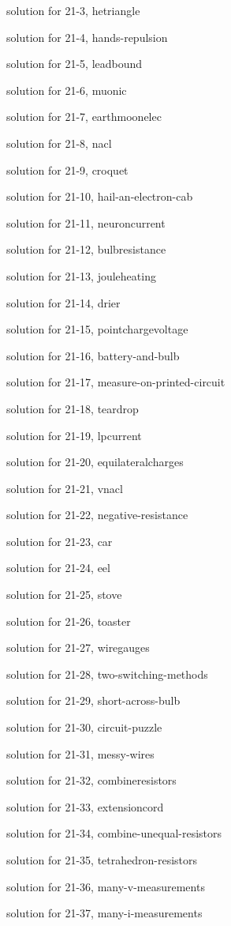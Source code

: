 \documentclass{problems}
\begin{document}
solution for 21-3, hetriangle

solution for 21-4, hands-repulsion

solution for 21-5, leadbound

solution for 21-6, muonic

solution for 21-7, earthmoonelec

solution for 21-8, nacl

solution for 21-9, croquet

solution for 21-10, hail-an-electron-cab

solution for 21-11, neuroncurrent

solution for 21-12, bulbresistance

solution for 21-13, jouleheating

solution for 21-14, drier

solution for 21-15, pointchargevoltage

solution for 21-16, battery-and-bulb

solution for 21-17, measure-on-printed-circuit

solution for 21-18, teardrop

solution for 21-19, lpcurrent

solution for 21-20, equilateralcharges

solution for 21-21, vnacl

solution for 21-22, negative-resistance

solution for 21-23, car

solution for 21-24, eel

solution for 21-25, stove

solution for 21-26, toaster

solution for 21-27, wiregauges

solution for 21-28, two-switching-methods

solution for 21-29, short-across-bulb

solution for 21-30, circuit-puzzle

solution for 21-31, messy-wires

solution for 21-32, combineresistors

solution for 21-33, extensioncord

solution for 21-34, combine-unequal-resistors

solution for 21-35, tetrahedron-resistors

solution for 21-36, many-v-measurements

solution for 21-37, many-i-measurements
\end{document}
